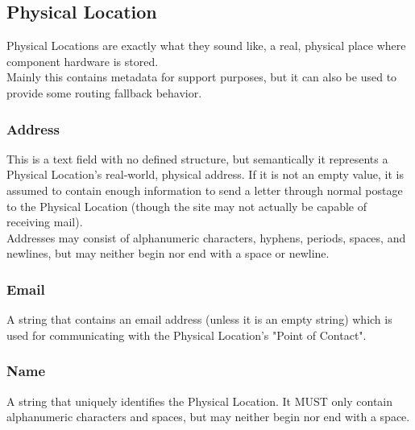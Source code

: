 %
%

\subsection{Physical Location}
Physical Locations are exactly what they sound like, a real, physical place
where component hardware is stored.\\
Mainly this contains metadata for support purposes, but it can also be used
to provide some routing fallback behavior.

\subsubsection{Address}
This is a text field with no defined structure, but semantically it represents
a Physical Location's real-world, physical address. If it is not an empty
value, it is assumed to contain enough information to send a letter through
normal postage to the Physical Location (though the site may not actually be
capable of receiving mail).\\
Addresses may consist of alphanumeric characters, hyphens, periods, spaces, and
newlines, but may neither begin nor end with a space or newline.

\subsubsection{Email}
A string that contains an email address (unless it is an empty string) which is
used for communicating with the Physical Location's "Point of Contact".

\subsubsection{Name}
A string that uniquely identifies the Physical Location. It MUST only contain
alphanumeric characters and spaces, but may neither begin nor end with a space.


